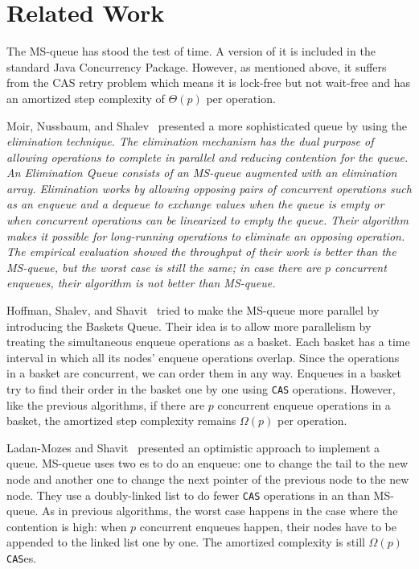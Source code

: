 
\section{Related Work}

The MS-queue \cite{DBLP:conf/podc/MichaelS96} has stood the test of time.
A version of it is
included in the standard Java Concurrency Package.  %
However, as mentioned above, it suffers from the CAS retry problem
which means it is lock-free but not wait-free and has an amortized step complexity
of $\Theta(p)$ per operation.

Moir, Nussbaum, and Shalev~\cite{DBLP:conf/spaa/MoirNSS05} presented a
more sophisticated queue by using the \it{elimination} technique. The
elimination mechanism has the dual purpose of allowing operations to
complete in parallel and reducing contention for the queue. An
Elimination Queue consists of an MS-queue augmented with an
elimination array. Elimination works by allowing opposing pairs of
concurrent operations such as an enqueue and a dequeue to exchange
values when the queue is empty or when concurrent operations can be
linearized to empty the queue. Their algorithm makes it possible for
long-running operations to eliminate an opposing operation. The
empirical evaluation showed the throughput of their work is better
than the MS-queue, but the worst case is still the same; in case there
are $p$ concurrent enqueues, their algorithm is not better than
MS-queue.  

Hoffman, Shalev, and Shavit~\cite{DBLP:conf/opodis/HoffmanSS07} tried
to make the MS-queue more parallel by introducing the Baskets
Queue. Their idea is to allow more parallelism by treating the
simultaneous enqueue operations as a basket. Each basket has a time
interval in which all its nodes' enqueue operations overlap. Since the
operations in a basket are concurrent, we can order them in any
way. Enqueues in a basket try to find their order in the basket one by
one using \texttt{CAS} operations. However, like the previous
algorithms, if there are $p$ concurrent enqueue operations in a
basket, the amortized step complexity remains $\Omega(p)$ per
operation. 

Ladan-Mozes and Shavit~\cite{DBLP:journals/dc/Ladan-MozesS08}
presented an optimistic approach to implement a queue. MS-queue uses
two es to do an enqueue: one to change the tail to the new
node and another one to change the next pointer of the previous node
to the new node. They use a doubly-linked list to do fewer
\texttt{CAS} operations in an  than MS-queue. As in
previous algorithms, the worst case happens in the case where the
contention is high: when $p$ concurrent enqueues happen, their nodes
have to be appended to the linked list one by one. The amortized
complexity is still $\Omega(p)$ \texttt{CAS}es. 

